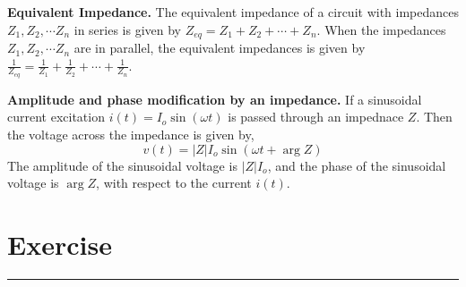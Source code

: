 \noindent\textbf{Equivalent Impedance.} The equivalent impedance of a circuit with impedances $Z_1, Z_2, \cdots Z_n$ in series is given by $Z_{eq} = Z_1 + Z_2 + \cdots + Z_n$. When the impedances $Z_1, Z_2, \cdots Z_n$ are in parallel, the equivalent impedances is given by $\frac{1}{Z_{eq}} = \frac{1}{Z_1} + \frac{1}{Z_2} + \cdots + \frac{1}{Z_n}$.

\noindent\textbf{Amplitude and phase modification by an impedance.} If a sinusoidal current excitation $i\left(t\right) = I_o \sin\left(\omega t\right)$ is passed through an impednace $Z$. Then the voltage across the impedance is given by,
\begin{equation}
    v\left(t\right) = \vert Z \vert I_o \sin\left(\omega t + \arg Z \right)
    \label{eq:02-36}
\end{equation}
The amplitude of the sinusoidal voltage is $\vert Z \vert I_o$, and the phase of the sinusoidal voltage is $\arg Z$, with respect to the current $i\left(t\right)$. 

\section{Exercise}
\vspace{-0.5cm}
\begin{center}
    \rule{\textwidth}{1pt}
\end{center}

